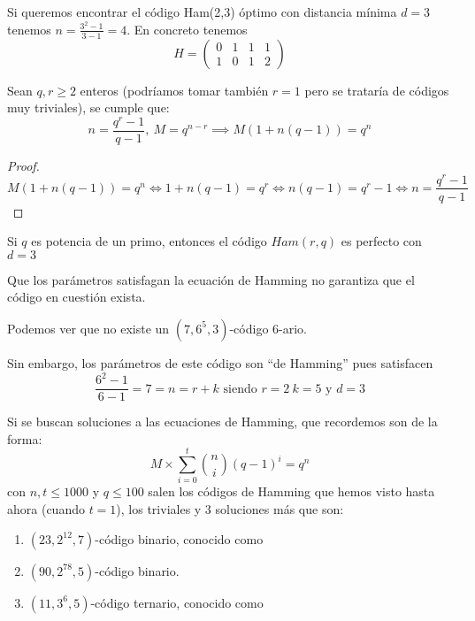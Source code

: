 \begin{example}
Si queremos encontrar el código Ham(2,3) óptimo con distancia mínima $d=3$ tenemos $n=\frac{3^2-1}{3-1}=4$. En concreto tenemos
\[H=\left( \begin{array}{cccc}
0 & 1 & 1 & 1 \\
1 & 0 & 1 & 2
\end{array}\right)\]
\end{example}

\begin{prop}
Sean $q,r \geq 2$ enteros (podríamos tomar también $r=1$ pero se trataría de códigos muy triviales), se cumple que:
\[n = \frac{q^r-1}{q-1}, \ M=q^{n-r} \implies M(1+n(q-1))=q^n\]
\end{prop}
\begin{proof}
\[M(1+n(q-1))=q^n \iff 1+n(q-1) = q^r \iff n(q-1)=q^r-1 \iff n=\frac{q^r-1}{q-1}\]
\end{proof}

\begin{corol}
Si $q$ es potencia de un primo, entonces el código $Ham(r,q)$ es perfecto con $d=3$
\end{corol}

\obs Que los parámetros satisfagan la ecuación de Hamming no garantiza que el código en cuestión exista.

\begin{example}
Podemos ver que no existe un $(7,6^5,3)$-código 6-ario.

Sin embargo, los parámetros de este código son ``de Hamming'' pues satisfacen
\[\frac{6^2-1}{6-1}=7=n=r+k \text{ siendo } r=2 \ k=5 \text{ y } d=3\]

\end{example}

Si se buscan soluciones a las ecuaciones de Hamming, que recordemos son de la forma:
\[M \times \sum_{i=0}^t {n \choose i} (q-1)^i=q^n\]
con $n,t \leq 1000$ y $q \leq 100$ salen los códigos de Hamming que hemos visto hasta ahora (cuando $t=1$), los triviales y 3 soluciones más que son:

\begin{enumerate}
\item $(23,2^{12},7)$-código binario, conocido como 
\item $(90,2^{78},5)$-código binario.
\item $(11,3^6,5)$-código ternario, conocido como 
\end{enumerate}

